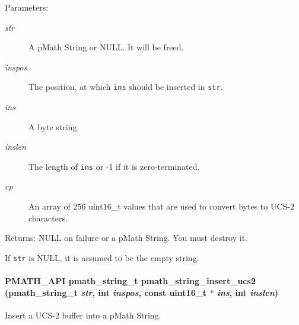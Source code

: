 \begin{Desc}
\item[Parameters:]
\begin{description}
\item[{\em str}]A pMath String or NULL. It will be freed. \item[{\em inspos}]The position, at which {\tt ins} should be inserted in {\tt str}. \item[{\em ins}]A byte string. \item[{\em inslen}]The length of {\tt ins} or -1 if it is zero-terminated. \item[{\em cp}]An array of 256 uint16\_\-t values that are used to convert bytes to UCS-2 characters. \end{description}
\end{Desc}
\begin{Desc}
\item[Returns:]NULL on failure or a pMath String. You must destroy it.\end{Desc}
If {\tt str} is NULL, it is assumed to be the empty string. \hypertarget{group__strings_ge49ea36d0f35856b6b9aeb0c4470c614}{
\paragraph[{pmath\_\-string\_\-insert\_\-ucs2}]{\setlength{\rightskip}{0pt plus 5cm}PMATH\_\-API {\bf pmath\_\-string\_\-t} pmath\_\-string\_\-insert\_\-ucs2 ({\bf pmath\_\-string\_\-t} {\em str}, \/  int {\em inspos}, \/  const uint16\_\-t $\ast$ {\em ins}, \/  int {\em inslen})}\hfill}
\label{group__strings_ge49ea36d0f35856b6b9aeb0c4470c614}


Insert a UCS-2 buffer into a pMath String. 


